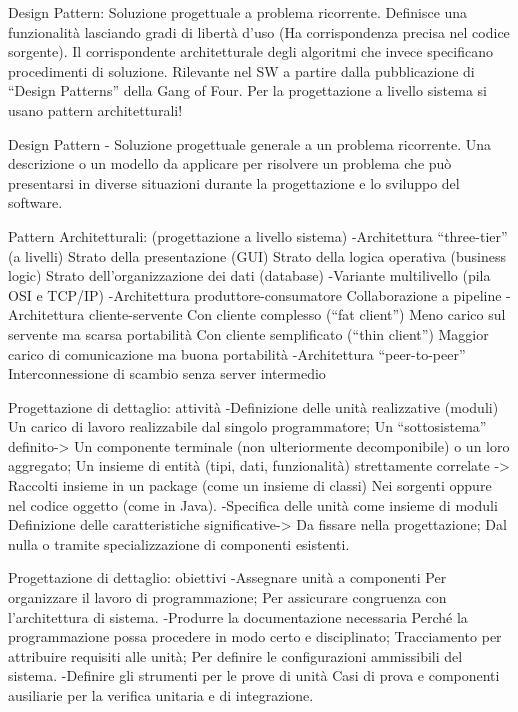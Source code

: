 \documentclass{report}
\begin{document}
Design Pattern:
Soluzione progettuale a problema ricorrente.
Definisce una funzionalità lasciando gradi di libertà d’uso (Ha corrispondenza precisa nel codice sorgente).
Il corrispondente architetturale degli algoritmi che invece specificano procedimenti di soluzione.
Rilevante nel SW a partire dalla pubblicazione di “Design Patterns” della Gang of Four.
Per la progettazione a livello sistema si usano pattern architetturali!

Design Pattern - Soluzione progettuale generale a un problema ricorrente. Una descrizione o un modello da applicare per risolvere un problema che può presentarsi in diverse situazioni durante la progettazione e lo sviluppo del software.

Pattern Architetturali: (progettazione a livello sistema)
-Architettura “three-tier” (a livelli)
 Strato della presentazione (GUI)
 Strato della logica operativa (business logic)
 Strato dell’organizzazione dei dati (database)
-Variante multilivello (pila OSI e TCP/IP)
-Architettura produttore-consumatore
 Collaborazione a pipeline
-Architettura cliente-servente
 Con cliente complesso (“fat client”) Meno carico sul servente ma scarsa portabilità
 Con cliente semplificato (“thin client”) Maggior carico di comunicazione ma buona portabilità
-Architettura “peer-to-peer”
 Interconnessione di scambio senza server intermedio

Progettazione di dettaglio: attività
-Definizione delle unità realizzative (moduli)
 Un carico di lavoro realizzabile dal singolo programmatore;
 Un “sottosistema” definito-> Un componente terminale (non ulteriormente decomponibile) o un loro aggregato;
 Un insieme di entità (tipi, dati, funzionalità) strettamente correlate -> Raccolti insieme in un package (come un insieme di classi) Nei  sorgenti oppure nel codice oggetto (come in Java).
-Specifica delle unità come insieme di moduli
 Definizione delle caratteristiche significative-> Da fissare nella progettazione;
 Dal nulla o tramite specializzazione di componenti esistenti.

Progettazione di dettaglio: obiettivi
-Assegnare unità a componenti
 Per organizzare il lavoro di programmazione;
 Per assicurare congruenza con l’architettura di sistema.
-Produrre la documentazione necessaria
 Perché la programmazione possa procedere in modo certo e disciplinato;
 Tracciamento per attribuire requisiti alle unità;
 Per definire le configurazioni ammissibili del sistema.
-Definire gli strumenti per le prove di unità
 Casi di prova e componenti ausiliarie per la verifica unitaria e di integrazione.
\end{document}
